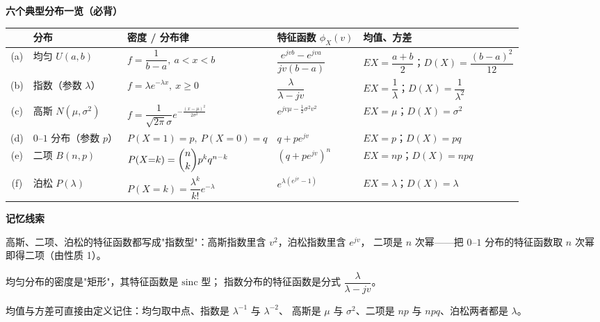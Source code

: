 \documentclass[10.5pt,fontset=fandol]{ctexart}
\newcommand{\key}[1]{\par\vspace{4pt}\noindent\textbf{\color{navy}#1}\par\vspace{2pt}}
\begin{document}
\noindent\textbf{六个典型分布一览（必背）}\par\smallskip\begin{tcolorbox}[breakable,colback=qbg,colframe=qbg,boxrule=0pt]\begin{center}
\renewcommand{\arraystretch}{1.75}
\scriptsize
\begin{tabularx}{\textwidth}{@{}c L{2.5cm} X X X@{}}
\toprule
& \textbf{分布} & \textbf{密度 / 分布律} & \textbf{特征函数 $\phi_X(v)$} & \textbf{均值、方差} \\
\midrule
(a) & 均匀 $U(a,b)$ & $f=\dfrac{1}{b-a},\ a<x<b$
    & $\dfrac{e^{jvb}-e^{jva}}{jv(b-a)}$
    & $EX=\dfrac{a+b}{2}$；$D(X)=\dfrac{(b-a)^2}{12}$ \\
(b) & 指数（参数 $\lambda$） & $f=\lambda e^{-\lambda x},\ x\ge0$
    & $\dfrac{\lambda}{\lambda-jv}$
    & $EX=\dfrac1\lambda$；$D(X)=\dfrac{1}{\lambda^2}$ \\
(c) & 高斯 $N(\mu,\sigma^2)$ & $f=\dfrac{1}{\sqrt{2\pi}\sigma}e^{-\frac{(x-\mu)^2}{2\sigma^2}}$
    & $e^{jv\mu-\frac12\sigma^2v^2}$
    & $EX=\mu$；$D(X)=\sigma^2$ \\
(d) & $0$--$1$ 分布（参数 $p$） & $P(X{=}1)=p,\ P(X{=}0)=q$
    & $q+pe^{jv}$
    & $EX=p$；$D(X)=pq$ \\
(e) & 二项 $B(n,p)$ & $P(X{=}k)=\dbinom{n}{k}p^kq^{n-k}$
    & $(q+pe^{jv})^n$
    & $EX=np$；$D(X)=npq$ \\
(f) & 泊松 $P(\lambda)$ & $P(X{=}k)=\dfrac{\lambda^k}{k!}e^{-\lambda}$
    & $e^{\lambda(e^{jv}-1)}$
    & $EX=\lambda$；$D(X)=\lambda$ \\
\bottomrule
\end{tabularx}
\end{center}

\vspace{2pt}
\key{记忆线索}
\begin{bul}
  \item 高斯、二项、泊松的特征函数都写成"指数型"：高斯指数里含 $v^2$，泊松指数里含 $e^{jv}$，
        二项是 $n$ 次幂——把 $0$--$1$ 分布的特征函数取 $n$ 次幂即得二项（由性质 1）。
  \item 均匀分布的密度是"矩形"，其特征函数是 $\mathrm{sinc}$ 型；
        指数分布的特征函数是分式 $\dfrac{\lambda}{\lambda-jv}$。
  \item 均值与方差可直接由定义记住：均匀取中点、指数是 $\lambda^{-1}$ 与 $\lambda^{-2}$、
        高斯是 $\mu$ 与 $\sigma^2$、二项是 $np$ 与 $npq$、泊松两者都是 $\lambda$。
\end{bul}
\end{tcolorbox}
\end{document}
